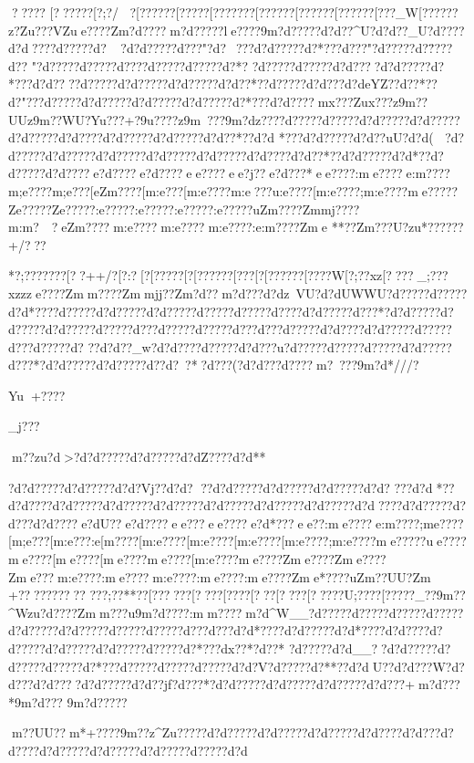 {{{{{{{{{{{{?????
[??????[?;?/
{?[?????{?[?????[?{?????{?[?????{?[?????{?[?????{?[???_W[??????z?Zu???VZue????Zm?d????m?d?????le????9m?d?????d?d??^U?d?d??_U?d?\  ???d?d????d?\*????d?\

 ?d?d?????d?\*??"?d?\
???d?d?????d?\?*???d?\*??"?d?\?????d?\"????d?\??
"?d?\?????d?\?????d?\????d?\?????d?\?????d?\?*?
?d?\*????d?\?????d?d????d?d?????d?\?*???d?d????d?\ ????d?d?????d?d?????d?d??*??d?\?????d?d???d?deYZ??d?\??*??d?\?"???d?\*????d?d?????d?d?????d?d?????d?\?*???d?d????mx\???Zux\ ???z}9m??UUz}9m??WU?}Yu???+?}9u????z}9m~???9m?dz????d?\ ????d?\?????d?d?????d?d?????d?d?????d?d????d?d?????d?d?????d?d??*??d?d
*???d?d?????d?d??uU?d?d(
?d?d?????d?d?????d?d?????d?d?????d?d?????d?d???}?d?d??*??d?d?????d?d*?  ?d?d?????d?d????e?d????e?d????ee????ee?j??e?d???*ee????:me????e:m????{m;e????{m;e???[eZm????[m:e???[m:e????{m:e???{u:e????[m:e????;m:e????{me?????}Ze?????}Ze?????}:e?????}:e?????}:e?????}:e?????uZm????Zm{mj????m:m?~~?eZm????m:e????m:e????m:e????:e:m????Zme
**??}Zm???U?zu*??????}
+/???

*?;???????[??++/?[?:?   [?[?????[?[?????{?[???[?[?????{?[????W[?;? ?xz[????_;??}?xzzz}e????Zmm????Zmmjj??Zm?d??m?d???\?d?dz~VU?d?dUWWU?d?\*????d?\?????d?d*????d?\?????d?d?????d?d?????d?\?????d?\?????d?\????d?d?????d?\???*?d?d?????d?d?????d?d?????d?\?????d?\???d?\?????d?\?????d?\???d?\???d?\*????d?d????d?d?????d?\?????d?\???d?\?????d?\?  ??d?d??_w?d?d????d?\*????d?d???u?d?\?????d?\?????d?\?????d?d?????d?\???*?d?d?????d?d?????d?\   ?d?\ ?*?d?\??(?d?d???d?\????m?\
???9m?d*///?}Yu+????}_j???}m??zu?d^^~?d?d?????d?d?????d?dZ????d?d**

?d?d?????d?d?????d?d?Vj??d?d? ??d?d?????d?d?????d?d?????d?d?
???d?d *??d?d????d?d?????d?d?????d?d?????d?d?????d?d?????d?d?????d?d????d?d?????d?d???d?d????e?dU??e?d????ee???ee????e?d*???ee??:me????e:m????;m{e????[m;e???[m:e???:e[m????[m:e????[m:e????[m:e????[m:e????;m:e????{me?????ue????{me????[me????[me????{me????[m:e????{me????Zme????Zme????Zme???m:e????:me????m:e????:me????:me????Zme*????uZm??UU?}Zm
+????}??????
???;??**??[??????[??  ??[???   ?[??   ?[??  ??[?????U;??  ??[??}???_??9m??^Wzu?d????Zmm???u9m?d????:mm????m?d^W__?d?\?????d?\?????d?\?????d?\?????d?d?????d?d?????d?\?????d?\?????d?\???d?\???d?d*????d?d?????d?d*????d?d????d?d?????d?d?????d?d?????d?\?????d?\**???dx\???*?d?\??*
?d?\?????d?d__??d?d?????d?d?????d?\?????d?\**???d?\*????d?\*????d?\?????d?d?V?d?\?????d?\?**??d?dU}??d?d???W?d?d??}?d?d????d?d?????d?d??jf?d?\???*?d?d?????d?d?????d?d?????d?d???+m?d???*9m?d???
9m?d?????}m??UU??m*+????9m??z^Zu?\?????d?d?????d?d?????d?d?????d?d????d?d???d?d????d?d?????d?d?????d?d?????d?\?????d?d


}}}}}}}
